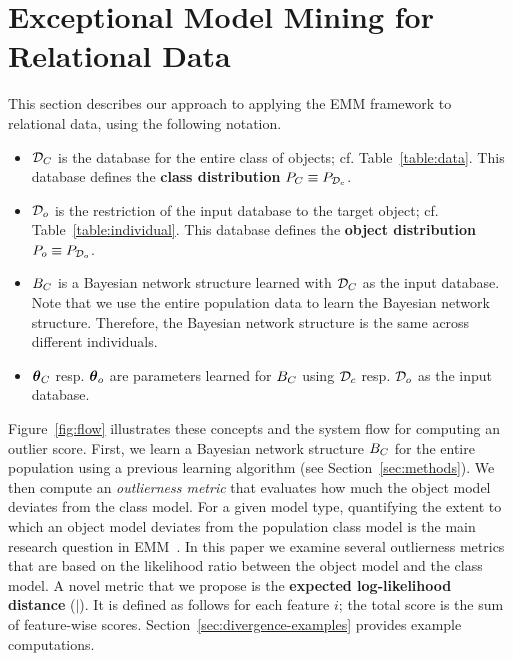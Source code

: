 {\section{Exceptional Model Mining for Relational Data} \label{sec:eld}

This section describes our approach to applying the EMM framework to relational data, using the following notation.
%
\begin{itemize}
	\item $\mathcal{D}_{C}$ is the database for the entire class of objects; cf. Table~\ref{table:data}. This database defines the \textbf{class distribution} $P_{C} \equiv P_{\mathcal{D}_{c}}$.
	\item $\mathcal{D}_{o}$ is the restriction of the input database to the target object; cf. Table~\ref{table:individual}. This database defines the \textbf{object distribution} $P_{o} \equiv P_{\mathcal{D}_{o}}$.
	\item $B_{C}$ is a Bayesian network structure learned with $\mathcal{D}_{C}$ as the input database. Note that we use the entire population data to learn the Bayesian network structure. Therefore, the Bayesian network structure is the same across different individuals.
	\item $\boldsymbol{\theta}_{C}$ resp. $\boldsymbol{\theta}_{o}$ are parameters learned for $B_{C}$ using $\mathcal{D}_{c}$ resp. $\mathcal{D}_{o}$ as the input database.
\end{itemize}

Figure~\ref{fig:flow} illustrates these concepts and the system flow for computing an outlier score. First, we learn a Bayesian network structure $B_{C}$ for the entire population using a previous learning algorithm (see Section~\ref{sec:methods}). We then compute an {\em outlierness metric} that evaluates how much the object model deviates from the class model. 
%
%
For a given model type, quantifying the extent to which an object model deviates from the population class model is the main research question in EMM~\cite{Duivesteijn2016}. In this paper we examine several outlierness metrics that are based on the likelihood ratio between the object model and the class model. 
A novel metric that we propose is the \textbf{expected log-likelihood distance} ($\mid$). It is defined as follows for each feature $i$; the total score is the sum of feature-wise scores. Section~\ref{sec:divergence-examples}  provides example computations.


}
